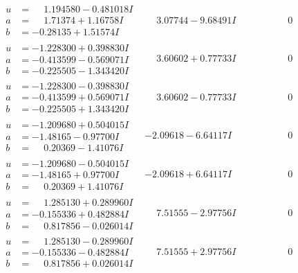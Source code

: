 \documentclass[1p]{elsarticle_modified}
\theoremstyle{definition}
\begin{document}
$$\begin{array}{c|c|c}
\begin{aligned}
u &= \phantom{-}1.194580 - 0.481018 I \\
a &= \phantom{-}1.71374 + 1.16758 I \\
b &= -0.28135 + 1.51574 I\end{aligned}
 & \phantom{-}3.07744 - 9.68491 I & \phantom{-0.000000 } 0 \\ \hline\begin{aligned}
u &= -1.228300 + 0.398830 I \\
a &= -0.413599 - 0.569071 I \\
b &= -0.225505 - 1.343420 I\end{aligned}
 & \phantom{-}3.60602 + 0.77733 I & \phantom{-0.000000 } 0 \\ \hline\begin{aligned}
u &= -1.228300 - 0.398830 I \\
a &= -0.413599 + 0.569071 I \\
b &= -0.225505 + 1.343420 I\end{aligned}
 & \phantom{-}3.60602 - 0.77733 I & \phantom{-0.000000 } 0 \\ \hline\begin{aligned}
u &= -1.209680 + 0.504015 I \\
a &= -1.48165 - 0.97700 I \\
b &= \phantom{-}0.20369 - 1.41076 I\end{aligned}
 & -2.09618 - 6.64117 I & \phantom{-0.000000 } 0 \\ \hline\begin{aligned}
u &= -1.209680 - 0.504015 I \\
a &= -1.48165 + 0.97700 I \\
b &= \phantom{-}0.20369 + 1.41076 I\end{aligned}
 & -2.09618 + 6.64117 I & \phantom{-0.000000 } 0 \\ \hline\begin{aligned}
u &= \phantom{-}1.285130 + 0.289960 I \\
a &= -0.155336 + 0.482884 I \\
b &= \phantom{-}0.817856 - 0.026014 I\end{aligned}
 & \phantom{-}7.51555 - 2.97756 I & \phantom{-0.000000 } 0 \\ \hline\begin{aligned}
u &= \phantom{-}1.285130 - 0.289960 I \\
a &= -0.155336 - 0.482884 I \\
b &= \phantom{-}0.817856 + 0.026014 I\end{aligned}
 & \phantom{-}7.51555 + 2.97756 I & \phantom{-0.000000 } 0\\

\end{array}$$
\end{document}

